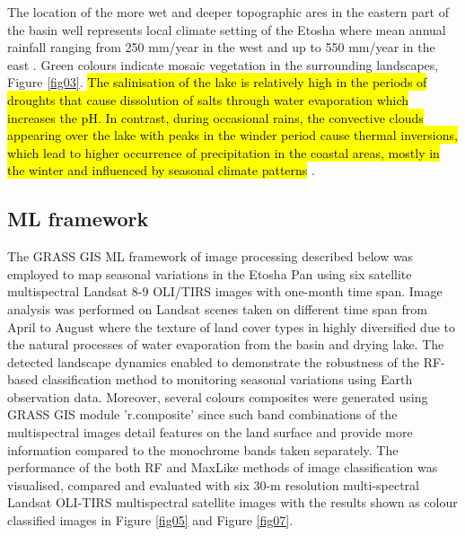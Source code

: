 \documentclass[climate,article,submit,pdftex,moreauthors]{Definitions/mdpi}
\begin{document}
The location of the more wet and deeper topographic ares in the eastern part of the basin well represents local climate setting of the Etosha where mean annual rainfall ranging from 250 mm/year in the west and up to 550 mm/year in the east \cite{Koeniger}. Green colours indicate mosaic vegetation in the surrounding landscapes, Figure \ref{fig03}. \hl{The salinisation of the lake is relatively high in the periods of droughts that cause dissolution of salts through water evaporation which increases the pH. In contrast, during occasional rains, the convective clouds appearing over the lake with peaks in the winder period cause thermal inversions, which lead to higher occurrence of precipitation in the coastal areas, mostly in the winter and influenced by seasonal climate patterns} \cite{SHIKANGALAH2022151974}.

\subsection{ML framework}

The GRASS GIS ML framework of image processing described below was employed to map seasonal variations in the Etosha Pan using six satellite multispectral Landsat 8-9 OLI/TIRS images with one-month time span. Image analysis was performed on Landsat scenes taken on different time span from April to August where the texture of land cover types in highly diversified due to the natural processes of water evaporation from the basin and drying lake. The detected landscape dynamics enabled to demonstrate the robustness of the RF-based classification method to monitoring seasonal variations using Earth observation data. Moreover, several colours composites were generated using GRASS GIS module 'r.composite' since such band combinations of the multispectral images detail features on the land surface  and provide more information compared to the monochrome bands taken separately. The performance of the both RF and MaxLike methods of image classification was visualised, compared  and evaluated with six 30-m resolution multi-spectral Landsat OLI-TIRS multispectral satellite images with the results shown as colour classified images in Figure \ref{fig05} and Figure \ref{fig07}. 
\end{document}
